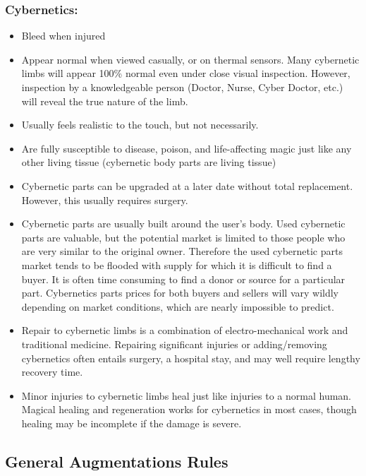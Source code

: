 \subsubsection{Cybernetics:}
\begin{itemize}
\item Bleed when injured
\item Appear normal when viewed casually, or on thermal sensors.  Many 
cybernetic limbs will appear 100\% normal even under close visual inspection.  
However, inspection by a knowledgeable person (Doctor, Nurse, Cyber Doctor, 
etc.) will reveal the true nature of the limb.
\item Usually feels realistic to the touch, but not necessarily.
\item Are fully susceptible to disease, poison, and life-affecting magic 
just like any other living tissue (cybernetic body parts are living tissue)
\item Cybernetic parts can be upgraded at a later date without total 
replacement.  However, this usually requires surgery.
\item Cybernetic parts are usually built around the user's body.  Used 
cybernetic parts are valuable, but the potential market is limited to those 
people who are very similar to the original owner.  Therefore the used 
cybernetic parts market tends to be flooded with supply for which it is 
difficult to find a buyer.  It is often time consuming to find a donor or 
source for a particular part.  Cybernetics parts prices for both buyers and 
sellers will vary wildly depending on market conditions, which are nearly 
impossible to predict.
\item Repair to cybernetic limbs is a combination of electro-mechanical work 
and traditional medicine.  Repairing significant injuries or adding/removing 
cybernetics often entails surgery, a hospital stay, and may well require 
lengthy recovery time.
\item Minor injuries to cybernetic limbs heal just like injuries to a normal 
human.  Magical healing and regeneration works for cybernetics in most cases, 
though healing may be incomplete if the damage is severe.
\end{itemize}

\subsection{General Augmentations Rules}

